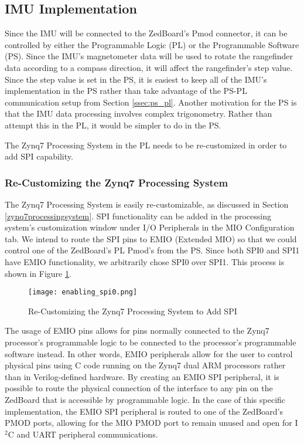 \subsection{IMU Implementation}
Since the IMU will be connected to the ZedBoard's Pmod connector, it can be controlled by either the Programmable Logic (PL) or the Programmable Software (PS). Since the IMU's magnetometer data will be used to rotate the rangefinder data according to a compass direction, it will affect the rangefinder's step value. Since the step value is set in the PS, it is easiest to keep all of the IMU's implementation in the PS rather than take advantage of the PS-PL communication setup from Section \ref{ssec:ps_pl}. Another motivation for the PS is that the IMU data processing involves complex trigonometry. Rather than attempt this in the PL, it would be simpler to do in the PS.
\par
The Zynq7 Processing System in the PL needs to be re-customized in order to add SPI capability.

\subsubsection{Re-Customizing the Zynq7 Processing System}
The Zynq7 Processing System is easily re-customizable, as discussed in Section \ref{zynq7processingsystem}. SPI functionality can be added in the processing system's customization window under I/O Peripherals in the MIO Configuration tab. We intend to route the SPI pins to EMIO (Extended MIO) so that we could control one of the ZedBoard's PL Pmod's from the PS. Since both SPI0 and SPI1 have EMIO functionality, we arbitrarily chose SPI0 over SPI1. This process is shown in Figure \ref{enabling_spi0}.

\begin{figure}[H]
	\centerline{\texttt{[image: enabling\_spi0.png]}}
	\caption{Re-Customizing the Zynq7 Processing System to Add SPI}
	\label{enabling_spi0}
\end{figure}

\par
The usage of EMIO pins allows for pins normally connected to the Zynq7 processor's programmable logic to be connected to the processor's programmable software instead. In other words, EMIO peripherals allow for the user to control physical pins using C code running on the Zynq7 dual ARM processors rather than in Verilog-defined hardware. By creating an EMIO SPI peripheral, it is possible to route the physical connection of the interface to any pin on the ZedBoard that is accessible by programmable logic. In the case of this specific implementation, the EMIO SPI peripheral is routed to one of the ZedBoard's PMOD ports, allowing for the MIO PMOD port to remain unused and open for I$^2$C and UART peripheral communications.







